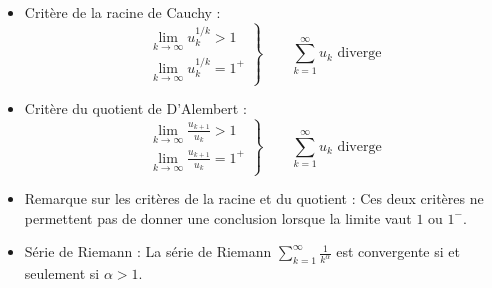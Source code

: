 \documentclass[a4paper]{article}
\begin{document}
\begin{itemize}
\begin{center}
\end{center}






\item Critère de la racine de Cauchy : 
\[
\left.
    \begin{aligned}
        \lim_{k \to \infty} u_k^{1/k} > 1 \\
        \lim_{k \to \infty} u_k^{1/k} = 1^+
    \end{aligned}
\right\}
\qquad \sum_{k=1}^{\infty} u_k \text{ diverge }
\]





\item Critère du quotient de D'Alembert : 
\[
\left.
    \begin{aligned}
        \lim_{k \to \infty} \frac{u_{k+1}}{u_k} > 1 \\
        \lim_{k \to \infty} \frac{u_{k+1}}{u_k} = 1^+
    \end{aligned}
\right\}
\qquad \sum_{k=1}^{\infty} u_k \text{ diverge }
\]





\item Remarque sur les critères de la racine et du quotient : Ces deux critères ne permettent pas de donner une conclusion lorsque la limite vaut $ 1 $ ou $ 1^- $.





\item Série de Riemann : La série de Riemann $\displaystyle \sum_{k=1}^{\infty} \frac{1}{k^{\alpha}} $ est convergente si et seulement si $ \alpha > 1 $.






\end{itemize}
\end{document}
